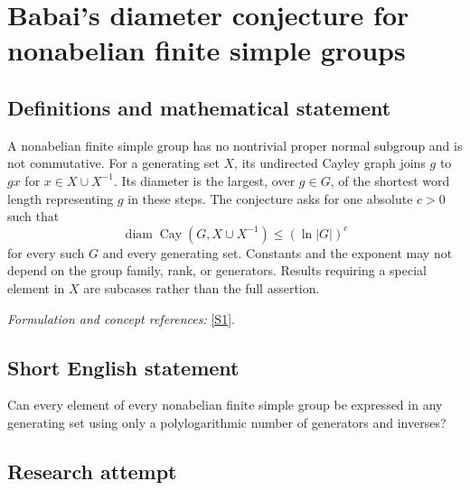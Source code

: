 \documentclass[11pt,a4paper]{article}
\newcommand{\sref}[2]{\hyperlink{source:#1:#2}{[S#2]}}
\newif\ifshowcatalogue
\newcommand{\cataloguescope}[1]{\ifshowcatalogue
 \paragraph{Exact scope in the supplied catalogue.}
 \begin{quote}\small #1\end{quote}\fi}
\numberwithin{equation}{section}
\begin{document}
\setcounter{section}{222}
\clearpage
\section{\texorpdfstring{Babai's diameter conjecture for nonabelian finite simple groups}{Babai's diameter conjecture for nonabelian finite simple groups}}\label{223}
\subsection{Definitions and mathematical statement}
A nonabelian finite simple group has no nontrivial proper normal subgroup and is not commutative. For a generating set $X$, its undirected Cayley graph joins $g$ to $gx$ for $x\in X\cup X^{-1}$. Its diameter is the largest, over $g\in G$, of the shortest word length representing $g$ in these steps. The conjecture asks for one absolute $c>0$ such that
\[
 \operatorname{diam}\operatorname{Cay}(G,X\cup X^{-1})\le(\ln|G|)^c
\]
for every such $G$ and every generating set. Constants and the exponent may not depend on the group family, rank, or generators. Results requiring a special element in $X$ are subcases rather than the full assertion.
\par\smallskip\textit{Formulation and concept references:} \sref{223}{1}.
\cataloguescope{Is there an absolute constant c>0 such that for every nonabelian finite simple group G and every generating set X of G, the undirected Cayley graph with steps X union X\textasciicircum{}\{-1\} has diameter at most (ln |G|)\textasciicircum{}c? Thus every element of G is a word of that length in X and its inverses, with the same c for all groups and generating sets.}
\subsection{Short English statement}
Can every element of every nonabelian finite simple group be expressed in any generating set using only a polylogarithmic number of generators and inverses?
\subsection{Research attempt}
\end{document}
